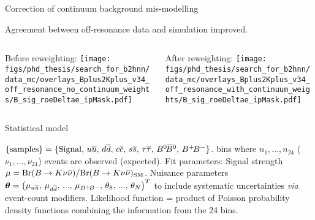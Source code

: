 \begin{frame}[noframenumbering]{Correction of continuum background mis-modelling}
\bi
\item Agreement between off-resonance data and simulation improved.
\ei
\vspace{0.5cm}
\begin{columns}
\begin{column}{0.5\linewidth}
{\small Before reweighting:}
\texttt{[image: figs/phd\_thesis/search\_for\_b2hnn/data\_mc/overlays\_Bplus2Kplus\_v34\_off\_resonance\_no\_continuum\_weights/B\_sig\_roeDeltae\_ipMask.pdf]}
\end{column}
\begin{column}{0.5\linewidth}
{\small After reweighting:}
\texttt{[image: figs/phd\_thesis/search\_for\_b2hnn/data\_mc/overlays\_Bplus2Kplus\_v34\_off\_resonance\_with\_continuum\_weights/B\_sig\_roeDeltae\_ipMask.pdf]}
\end{column}
\end{columns}
\end{frame}
\begin{frame}[noframenumbering]{Statistical model}
\bi
\item {$\{\mathrm{samples}\}=\{\mathrm{Signal},\,\uubar,\,\ddbar,\,\ccbar,\,\ssbar,\,\tau\overline{\tau},\,\BzBzb,\,\BpBm\}$.}
 bins where $n_1,...,n_{24}$ ($\nu_1,...,\nu_{24}$) events are observed (expected).
\itemii Fit parameters:
\bi
\itemii Signal strength $\mu=\mathrm{Br}(B\rightarrow K\nu\bar{\nu})/\mathrm{Br}(B\rightarrow K\nu\bar{\nu})_{\mathrm{SM}}$.
\itemii Nuisance parameters $\boldsymbol{\theta}=\begin{pmatrix} \mu_{u\overline u},\,\mu_{d\overline d},\,...,\,\mu_{B^+ {\kern -0.16em B^-}},\,\theta_{8},\,...,\,\theta_{N} \end{pmatrix}^T$ to include systematic uncertainties \textit{via} event-count modifiers.
\ei
\itemii Likelihood function = product of Poisson probability density functions combining the information from the 24 bins. 
\bi
{}
\ei
\ei
\end{frame}
